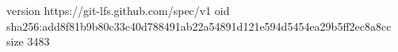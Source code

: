 version https://git-lfs.github.com/spec/v1
oid sha256:add8f81b9b80c33c40d788491ab22a54891d121e594d5454ea29b5ff2ec8a8cc
size 3483
